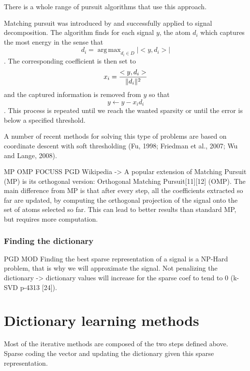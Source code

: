 \documentclass[a4paper,11pt]{article}
\DeclarePairedDelimiter\norm{\lVert}{\rVert} %
\DeclareMathOperator*{\argmax}{arg\,max} %
\begin{document}
There is a whole range of pursuit algorithms that use this approach.

Matching pursuit was introduced by \cite{mallat93} and successfully applied to signal decomposition.
The algorithm finds for each signal $y$, the atom $d_i$ which captures the most energy in the sense that
$$d_i = \argmax_{d_i \in D} |<y, d_i>|$$.
The corresponding coefficient is then set to $$x_i = \frac{<y, d_i>}{\norm{d_i}^2}$$ and the captured information is removed from $y$ so that $$y \leftarrow y - x_i d_i$$.
This process is repeated until we reach the wanted sparsity or until the error is below a specified threshold.

A number of recent methods for solving this type of problems are based on coordinate
descent with soft thresholding (Fu, 1998; Friedman et al., 2007; Wu and Lange, 2008).

MP OMP FOCUSS \cite{gorodnitsky97} PGD
Wikipedia -> A popular extension of Matching Pursuit (MP) is its orthogonal version: Orthogonal Matching Pursuit[11][12] (OMP). The main difference from MP is that after every step, all the coefficients extracted so far are updated, by computing the orthogonal projection of the signal onto the set of atoms selected so far. This can lead to better results than standard MP, but requires more computation.
\subsubsection{Finding the dictionary}
PGD MOD
Finding the best sparse representation of a signal is a NP-Hard problem, that is why we will approximate the signal.
Not penalizing the dictionary -> dictionary values will increase for the sparse coef to tend to 0
\cite{olshausen97} (k-SVD p-4313 [24]).
\section{Dictionary learning methods}
Most of the iterative methods are composed of the two steps defined above.
Sparse coding the vector and updating the dictionary given this sparse representation.
\end{document}
